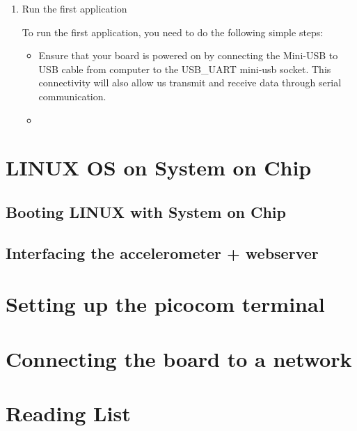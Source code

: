 \documentclass{article}
\newenvironment{myitemize}
{ \begin{itemize}
    \setlength{\itemsep}{0pt}
    \setlength{\parskip}{0pt}
    \setlength{\parsep}{0pt}     }
{ \end{itemize}                  }
\begin{document}
\begin{enumerate}
\item Run the first application

To run the first application, you need to do the following simple steps:
\begin{myitemize}
\item Ensure that your board is powered on by connecting the Mini-USB to USB cable from computer to the USB\_UART mini-usb socket. This connectivity will also allow us transmit and receive data through serial communication.
\item 
\end{myitemize}

\end{enumerate}


















\clearpage

\section{LINUX OS on System on Chip}





\subsection{Booting LINUX with System on Chip}

\subsection{Interfacing the accelerometer + webserver}
 
 
\clearpage

\begin{appendices}
\section{Setting up the picocom terminal}
\label{appendix:graph}


\clearpage
\section{Connecting the board to a network}
\label{appendix:b}

\end{appendices}
\newpage
\section*{Reading List}




  
\end{document}
